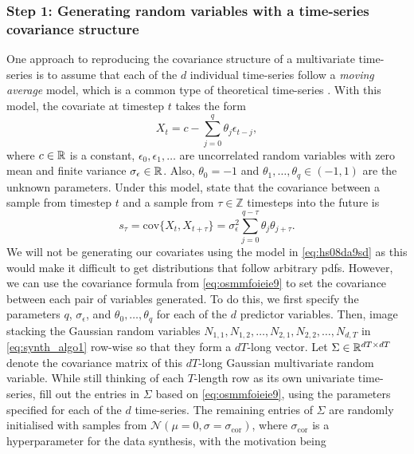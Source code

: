 \documentclass{statsmsc}
\begin{document}
{\subsubsection{Step 1: Generating random variables with a time-series covariance structure}%
\label{ssub:Step 1: Generating correlated random variables}

One approach to reproducing the covariance structure of a multivariate time-series is to assume
that each of the $d$ individual time-series follow a \textit{moving average} model, which is
a common type of theoretical time-series \citep{time-series}. With this model, the covariate at
timestep $t$ takes the form
\begin{equation}\label{eq:hs08da9sd}
    X_t=c-\sum^{q}_{j=0} \theta_j \epsilon_{t-j},
\end{equation}
where $c \in \mathbb{R}$ is a constant, $\epsilon_0,\epsilon_1,\dots$ are uncorrelated random variables with
zero mean and finite variance $\sigma_\epsilon\in\mathbb{R}$. Also, $\theta_0=-1$ and
$\theta_1,\dots,\theta_q \in (-1,1)$ are the unknown parameters.
Under this model, \cite{time-series} state that the covariance between a sample
from timestep $t$ and a sample from $\tau \in \mathbb{Z}$ timesteps into the
future is 
\begin{equation}\label{eq:osmmfoieie9}
    s_\tau=\textrm{cov}\{X_t,X_{t+\tau}\}=\sigma_\epsilon^2 \sum^{q-\tau}_{j=0}
    \theta_j \theta_{j+\tau}.
\end{equation}
We will not be generating our covariates using the model in \cref{eq:hs08da9sd} as this would
make it difficult to get distributions that follow arbitrary \acp{pdf}. However,
we can use the covariance formula from \cref{eq:osmmfoieie9} to set the covariance between each
pair of variables generated. To do this, we first specify the parameters $q$, $\sigma_\epsilon$, and
$\theta_0,\dots,\theta_q$ for each of the $d$ predictor variables. Then, image stacking the
Gaussian random variables $N_{1,1}, N_{1,2}, \dots, N_{2,1}, N_{2,2}, \dots,
N_{d,T}$ in \cref{eq:synth_algo1} row-wise so that they form a $dT$-long vector. Let $\Sigma \in \mathbb{R}^{dT\times dT}$ denote the covariance matrix of this $dT$-long Gaussian multivariate random variable.
While still thinking of each $T$-length row as its own univariate time-series, fill out the 
entries in
$\Sigma$ based on \cref{eq:osmmfoieie9}, using the parameters specified for each of the $d$
time-series. The remaining entries of $\Sigma$ are randomly initialised with samples from
$\mathcal{N}(\mu=0,\sigma=\sigma_{\textrm{cor}})$, where
$\sigma_{\textrm{cor}}$ is a hyperparameter for the data synthesis, with the motivation being
}
\end{document}
